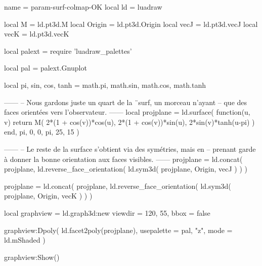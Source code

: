 \documentclass[border = 3pt]{standalone}
\begin{document}
\begin{luadraw*}{name = param-surf-colmap-OK}
local ld = luadraw

local M      = ld.pt3d.M
local Origin = ld.pt3d.Origin
local vecJ   = ld.pt3d.vecJ
local vecK   = ld.pt3d.vecK

local palext = require 'luadraw_palettes'

local pal = palext.Gnuplot

local pi, sin, cos, tanh = math.pi, math.sin, math.cos, math.tanh

------
-- Nous gardons juste un quart de la ¨surf, un morceau n'ayant
-- que des faces orientées vers l'observateur.
------
local projplane = ld.surface(
  function(u, v)
    return M(
      2*(1 + cos(v))*cos(u),
      2*(1 + cos(v))*sin(u),
      2*sin(v)*tanh(u-pi)
    )
  end,
  pi, 0, 0, pi,
  {25, 15}
)

------
-- Le reste de la surface s'obtient via des symétries, mais en
-- prenant garde à donner la bonne orientation aux faces visibles.
------
projplane = ld.concat(
  projplane,
  ld.reverse_face_orientation(
    ld.sym3d(
      projplane,
      {Origin, vecJ}
    )
  )
)

projplane = ld.concat(
  projplane,
  ld.reverse_face_orientation(
    ld.sym3d(
      projplane,
      {Origin, vecK}
    )
  )
)

local graphview = ld.graph3d:new{
  viewdir = {120, 55},
  bbox    = false
}

graphview:Dpoly(
  ld.facet2poly(projplane),
  {
    usepalette = {pal, "z"},
    mode       = ld.mShaded
  }
)

graphview:Show()
\end{luadraw*}
\end{document}
